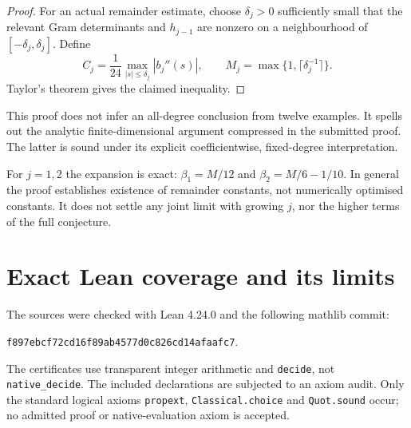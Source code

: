 \documentclass[11pt,a4paper]{article}
\begin{document}
\begin{proof}
For an actual remainder estimate, choose $\delta_j>0$ sufficiently small that the relevant Gram determinants and $h_{j-1}$ are nonzero on a neighbourhood of $[-\delta_j,\delta_j]$. Define
\[
C_j=\frac1{24}\max_{|s|\leq\delta_j}|b_j''(s)|,\qquad
M_j=\max\{1,\lceil\delta_j^{-1}\rceil\}.
\]
Taylor's theorem gives the claimed inequality.
\end{proof}

This proof does not infer an all-degree conclusion from twelve examples. It spells out the analytic finite-dimensional argument compressed in the submitted proof. The latter is sound under its explicit coefficientwise, fixed-degree interpretation.

For $j=1,2$ the expansion is exact: $\beta_1=M/12$ and $\beta_2=M/6-1/10$. In general the proof establishes existence of remainder constants, not numerically optimised constants. It does not settle any joint limit with growing $j$, nor the higher terms of the full conjecture.

\section{Exact Lean coverage and its limits}
The sources were checked with Lean 4.24.0 and the following mathlib commit:
\begin{center}
\texttt{f897ebcf72cd16f89ab4577d0c826cd14afaafc7}.
\end{center}
The certificates use transparent integer arithmetic and \texttt{decide}, not \texttt{native\_decide}. The included declarations are subjected to an axiom audit. Only the standard logical axioms \texttt{propext}, \texttt{Classical.choice} and \texttt{Quot.sound} occur; no admitted proof or native-evaluation axiom is accepted.
\end{document}
